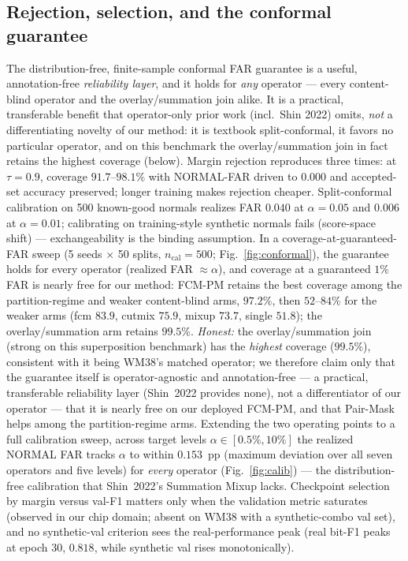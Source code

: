 \documentclass[11pt]{article}
\begin{document}
\subsection{Rejection, selection, and the conformal guarantee}
The distribution-free, finite-sample conformal FAR guarantee is a useful,
annotation-free \emph{reliability layer}, and it holds for \emph{any} operator ---
every content-blind operator and the overlay/summation join alike. It is a practical,
transferable benefit that operator-only prior work (incl.\ Shin 2022) omits, \emph{not} a
differentiating novelty of our method: it is textbook split-conformal, it favors no
particular operator, and on this benchmark the overlay/summation join in fact retains the
highest coverage (below). Margin rejection
reproduces three times: at $\tau{=}0.9$, coverage $91.7$--$98.1\%$ with NORMAL-FAR
driven to $0.000$ and accepted-set accuracy preserved; longer training makes rejection
cheaper. Split-conformal calibration on 500 known-good normals realizes FAR $0.040$ at
$\alpha{=}0.05$ and $0.006$ at $\alpha{=}0.01$; calibrating on training-style
synthetic normals fails (score-space shift) --- exchangeability is the binding
assumption. In a coverage-at-guaranteed-FAR sweep (5 seeds $\times$ 50 splits,
$n_{\mathrm{cal}}{=}500$; Fig.~\ref{fig:conformal}), the guarantee holds for every
operator (realized FAR $\approx\alpha$), and coverage at a guaranteed $1\%$ FAR is
nearly free for our method: FCM-PM retains the best coverage among the
partition-regime and weaker content-blind arms, $\mathbf{97.2\%}$, then $52$--$84\%$
for the weaker arms (fcm $83.9$, cutmix $75.9$, mixup $73.7$, single $51.8$); the
overlay/summation arm retains $99.5\%$. \emph{Honest:} the overlay/summation join
(strong on this superposition benchmark) has the \emph{highest} coverage ($99.5\%$),
consistent with it being WM38's matched operator; we therefore claim only that the
guarantee itself is operator-agnostic and annotation-free --- a practical, transferable
reliability layer (Shin~2022 provides none), not a differentiator of our operator --- that
it is nearly free on our deployed FCM-PM, and that Pair-Mask helps among
the partition-regime arms. Extending the two operating points to a full calibration sweep,
across target levels $\alpha\in[0.5\%,10\%]$ the realized NORMAL FAR tracks $\alpha$
to within $0.153$~pp (maximum deviation over all seven operators and five levels) for
\emph{every} operator (Fig.~\ref{fig:calib}) --- the distribution-free calibration
that Shin~2022's Summation Mixup lacks. Checkpoint selection by margin versus val-F1
matters only when the validation metric saturates (observed in our chip domain;
absent on WM38 with a synthetic-combo val set), and no synthetic-val criterion sees
the real-performance peak (real bit-F1 peaks at epoch 30, $0.818$, while synthetic
val rises monotonically).
\end{document}
